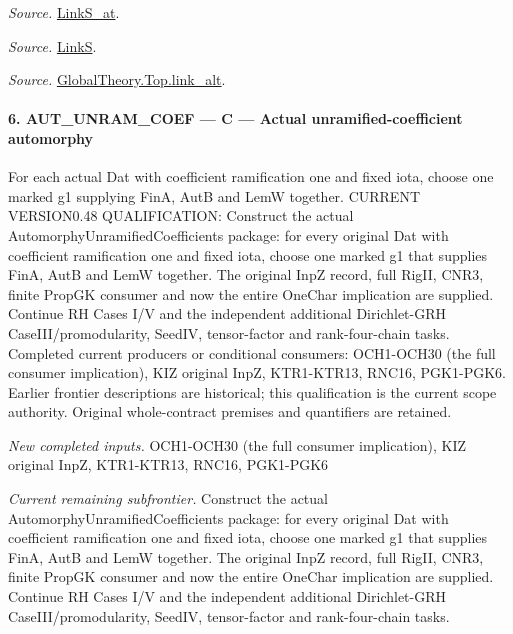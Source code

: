 \emph{Source.} \href{https://github.com/CocoSgt/riemann-hypothesis-lean/blob/7cbf7a0c32fca1badf05931879a37c3f8a2b03b4/src/Formalism/SharpRestriction/GlobalTheoremInputs.lean#L145-L149}{LinkS\_\allowbreak at}.

\emph{Source.} \href{https://github.com/CocoSgt/riemann-hypothesis-lean/blob/7cbf7a0c32fca1badf05931879a37c3f8a2b03b4/src/Formalism/SharpRestriction/GlobalTheoremInputs.lean#L152-L157}{LinkS}.

\emph{Source.} \href{https://github.com/CocoSgt/riemann-hypothesis-lean/blob/7cbf7a0c32fca1badf05931879a37c3f8a2b03b4/src/Development/AbelianVarietyTheory/Proofs/GlobalInterpolation/LinkAlt.lean#L16-L50}{GlobalTheory.Top.link\_\allowbreak alt}.



\paragraph{6. AUT\_\allowbreak UNRAM\_\allowbreak COEF — C — Actual unramified-coefficient automorphy}

For each actual Dat with coefficient ramification one and fixed iota, choose one marked g1 supplying FinA, AutB and LemW together. CURRENT VERSION0.48 QUALIFICATION: Construct the actual AutomorphyUnramifiedCoefficients package: for every original Dat with coefficient ramification one and fixed iota, choose one marked g1 that supplies FinA, AutB and LemW together. The original InpZ record, full RigII, CNR3, finite PropGK consumer and now the entire OneChar implication are supplied. Continue RH Cases I/V and the independent additional Dirichlet-GRH CaseIII/promodularity, SeedIV, tensor-factor and rank-four-chain tasks. Completed current producers or conditional consumers: OCH1-OCH30 (the full consumer implication), KIZ original InpZ, KTR1-KTR13, RNC16, PGK1-PGK6. Earlier frontier descriptions are historical; this qualification is the current scope authority. Original whole-contract premises and quantifiers are retained.

\emph{New completed inputs.} OCH1-OCH30 (the full consumer implication), KIZ original InpZ, KTR1-KTR13, RNC16, PGK1-PGK6

\emph{Current remaining subfrontier.} Construct the actual AutomorphyUnramifiedCoefficients package: for every original Dat with coefficient ramification one and fixed iota, choose one marked g1 that supplies FinA, AutB and LemW together. The original InpZ record, full RigII, CNR3, finite PropGK consumer and now the entire OneChar implication are supplied. Continue RH Cases I/V and the independent additional Dirichlet-GRH CaseIII/promodularity, SeedIV, tensor-factor and rank-four-chain tasks.

